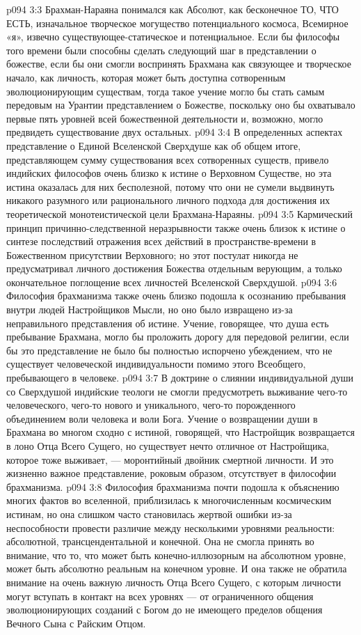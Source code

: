 \vs p094 3:3 Брахман\hyp{}Нараяна понимался как Абсолют, как бесконечное ТО, ЧТО ЕСТЬ, изначальное творческое могущество потенциального космоса, Всемирное «я», извечно существующее\hyp{}статическое и потенциальное. Если бы философы того времени были способны сделать следующий шаг в представлении о божестве, если бы они смогли воспринять Брахмана как связующее и творческое начало, как личность, которая может быть доступна сотворенным эволюционирующим существам, тогда такое учение могло бы стать самым передовым на Урантии представлением о Божестве, поскольку оно бы охватывало первые пять уровней всей божественной деятельности и, возможно, могло предвидеть существование двух остальных.
\vs p094 3:4 В определенных аспектах представление о Единой Вселенской Сверхдуше как об общем итоге, представляющем сумму существования всех сотворенных существ, привело индийских философов очень близко к истине о Верховном Существе, но эта истина оказалась для них бесполезной, потому что они не сумели выдвинуть никакого разумного или рационального личного подхода для достижения их теоретической монотеистической цели Брахмана\hyp{}Нараяны.
\vs p094 3:5 Кармический принцип причинно\hyp{}следственной неразрывности также очень близок к истине о синтезе последствий отражения всех действий в пространстве\hyp{}времени в Божественном присутствии Верховного; но этот постулат никогда не предусматривал личного достижения Божества отдельным верующим, а только окончательное поглощение всех личностей Вселенской Сверхдушой.
\vs p094 3:6 Философия брахманизма также очень близко подошла к осознанию пребывания внутри людей Настройщиков Мысли, но оно было извращено из\hyp{}за неправильного представления об истине. Учение, говорящее, что душа есть пребывание Брахмана, могло бы проложить дорогу для передовой религии, если бы это представление не было бы полностью испорчено убеждением, что не существует человеческой индивидуальности помимо этого Всеобщего, пребывающего в человеке.
\vs p094 3:7 В доктрине о слиянии индивидуальной души со Сверхдушой индийские теологи не смогли предусмотреть выживание чего\hyp{}то человеческого, чего\hyp{}то нового и уникального, чего\hyp{}то порожденного объединением воли человека и воли Бога. Учение о возвращении души в Брахмана во многом сходно с истиной, говорящей, что Настройщик возвращается в лоно Отца Всего Сущего, но существует нечто отличное от Настройщика, которое тоже выживает, --- моронтийный двойник смертной личности. И это жизненно важное представление, роковым образом, отсутствует в философии брахманизма.
\vs p094 3:8 Философия брахманизма почти подошла к объяснению многих фактов во вселенной, приблизилась к многочисленным космическим истинам, но она слишком часто становилась жертвой ошибки из\hyp{}за неспособности провести различие между несколькими уровнями реальности: абсолютной, трансцендентальной и конечной. Она не смогла принять во внимание, что то, что может быть конечно\hyp{}иллюзорным на абсолютном уровне, может быть абсолютно реальным на конечном уровне. И она также не обратила внимание на очень важную личность Отца Всего Сущего, с которым личности могут вступать в контакт на всех уровнях --- от ограниченного общения эволюционирующих созданий с Богом до не имеющего пределов общения Вечного Сына с Райским Отцом.
